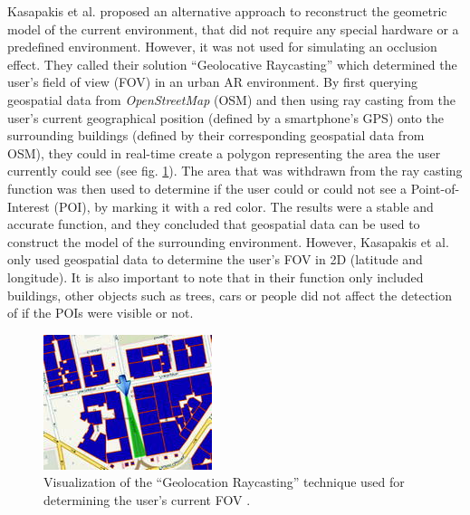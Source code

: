 Kasapakis et al. \cite{kasapakis2015determining} proposed an alternative approach to reconstruct the geometric model of the current environment, that did not require any special hardware or a predefined environment. However, it was not used for simulating an occlusion effect. They called their solution ``Geolocative Raycasting'' which determined the user's field of view (FOV) in an urban AR environment. By first querying geospatial data from \textit{OpenStreetMap} (OSM) and then using ray casting from the user's current geographical position (defined by a smartphone's GPS) onto the surrounding buildings (defined by their corresponding geospatial data from OSM), they could in real-time create a polygon representing the area the user currently could see (see fig. \ref{fig:_image_kasapakis}). The area that was withdrawn from the ray casting function was then used to determine if the user could or could not see a Point-of-Interest (POI), by marking it with a red color. The results were a stable and accurate function, and they concluded that geospatial data can be used to construct the model of the surrounding environment. However, Kasapakis et al. \cite{kasapakis2015determining} only used geospatial data to determine the user's FOV in 2D (latitude and longitude). It is also important to note that in their function only included buildings, other objects such as trees, cars or people did not affect the detection of if the POIs were visible or not.
\begin{figure}
\includegraphics{_image_kasapakis}
\caption{Visualization of the ``Geolocation Raycasting'' technique used for determining the user's current FOV \cite{kasapakis2015determining}.}
\label{fig:_image_kasapakis}
\end{figure}

